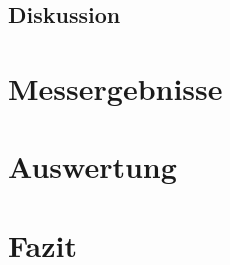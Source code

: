 \documentclass[12pt]{scrartcl}
\begin{document}
\subsection{Diskussion}

\section{Messergebnisse}



\section{Auswertung}

\section{Fazit}



\end{document}
